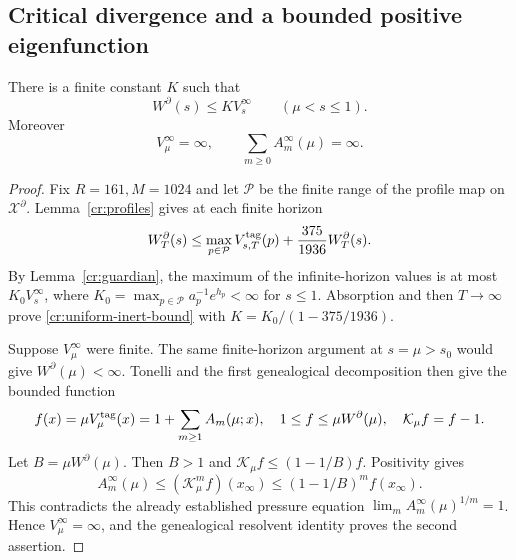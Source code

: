 \subsection{Critical divergence and a bounded positive eigenfunction}

\begin{theorem}
\label{cr:uniform-inert}
There is a finite constant $K$ such that
\begin{equation}
 W^\partial(s)\le K V_s^\infty
 \qquad(\mu<s\le1).
 \label{cr:uniform-inert-bound}
\end{equation}
Moreover
\begin{equation}
 \boxed{V_\mu^\infty=\infty,
 \qquad\sum_{m\ge0}A_m^\infty(\mu)=\infty.}
 \label{cr:critical-divergence}
\end{equation}
\end{theorem}
\begin{proof}
Fix $R=161,M=1024$ and let $\mathcal P$ be the finite range of the
profile map on $\mathcal X^\partial$.  Lemma~\ref{cr:profiles} gives
at each finite horizon
\[
 W_T^\partial(s)\le
 \max_{p\in\mathcal P}V_{s,T}^{\rm tag}(p)
 +\frac{375}{1936}W_T^\partial(s).
\]
By Lemma~\ref{cr:guardian}, the maximum of the infinite-horizon values
is at most $K_0V_s^\infty$, where
$K_0=\max_{p\in\mathcal P}a_p^{-1}e^{h_p}<\infty$ for $s\le1$.
Absorption and then $T\to\infty$ prove
\eqref{cr:uniform-inert-bound} with
$K=K_0/(1-375/1936)$.

Suppose $V_\mu^\infty$ were finite.  The same finite-horizon argument
at $s=\mu>s_0$ would give $W^\partial(\mu)<\infty$.  Tonelli and the
first genealogical decomposition then give the bounded function
\[
 f(x)=\mu V_\mu^{\rm tag}(x)
      =1+\sum_{m\ge1}A_m(\mu;x),
 \quad 1\le f\le\mu W^\partial(\mu),
 \quad\mathcal K_\mu f=f-1.
\]
Let $B=\mu W^\partial(\mu)$.  Then $B>1$ and
$\mathcal K_\mu f\le(1-1/B)f$.  Positivity gives
\[
 A_m^\infty(\mu)
 \le (\mathcal K_\mu^m f)(x_\infty)
 \le (1-1/B)^m f(x_\infty).
\]
This contradicts the already established pressure equation
$\lim_m A_m^\infty(\mu)^{1/m}=1$.  Hence
$V_\mu^\infty=\infty$, and the genealogical resolvent identity proves
the second assertion.
\end{proof}

